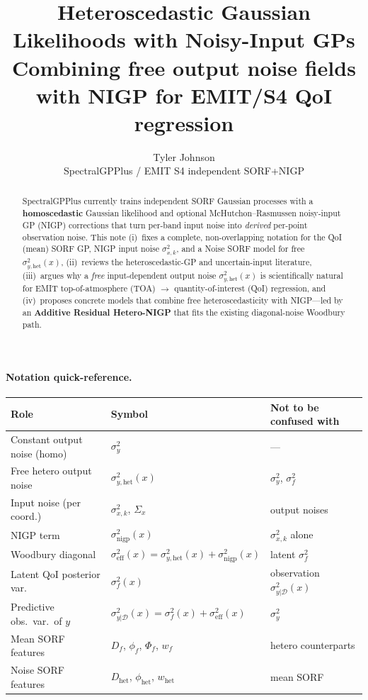 \documentclass[11pt]{article}
\title{Heteroscedastic Gaussian Likelihoods with Noisy-Input GPs\\[0.35em]
\large Combining free output noise fields with NIGP for EMIT/S4 QoI regression}
\author{Tyler Johnson\\
\small SpectralGPPlus / EMIT S4 independent SORF+NIGP}
\date{}
\newcommand{\sigy}{\sigma_{y}^{2}}%
\newcommand{\sighet}{\sigma_{y,\mathrm{het}}^{2}}%
\newcommand{\signigp}{\sigma_{\mathrm{nigp}}^{2}}%
\newcommand{\sigeff}{\sigma_{\mathrm{eff}}^{2}}%
\newcommand{\sigobs}{\sigma_{y|\mathcal{D}}^{2}}%
\newcommand{\Sigx}{\Sigma_{x}}%
\newcommand{\Phif}{\Phi_{f}}%
\begin{document}
\maketitle

\begin{abstract}
\noindent
SpectralGPPlus currently trains independent SORF Gaussian processes with a
\textbf{homoscedastic} Gaussian likelihood and optional McHutchon--Rasmussen
noisy-input GP (NIGP) corrections that turn per-band input noise into
\emph{derived} per-point observation noise.
This note (i)~fixes a complete, non-overlapping notation for the QoI (mean) SORF GP,
NIGP input noise $\sigma_{x,k}^{2}$, and a Noise SORF model for free
$\sighet(x)$,
(ii)~reviews the heteroscedastic-GP and uncertain-input literature,
(iii)~argues why a \emph{free} input-dependent output noise $\sighet(x)$
is scientifically natural for EMIT top-of-atmosphere (TOA) $\to$ quantity-of-interest
(QoI) regression, and (iv)~proposes concrete models that combine free
heteroscedasticity with NIGP---led by an \textbf{Additive Residual Hetero-NIGP}
that fits the existing diagonal-noise Woodbury path.
\end{abstract}

\paragraph{Notation quick-reference.}
\begin{center}
\small
\begin{tabular}{@{}lll@{}}
\toprule
\textbf{Role} & \textbf{Symbol} & \textbf{Not to be confused with} \\
\midrule
Constant output noise (homo) & $\sigy$ & --- \\
Free hetero output noise & $\sighet(x)$ & $\sigy$, $\sigma_f^{2}$ \\
Input noise (per coord.) & $\sigma_{x,k}^{2}$, $\Sigx$ & output noises \\
NIGP term & $\signigp(x)$ & $\sigma_{x,k}^{2}$ alone \\
Woodbury diagonal & $\sigeff(x)=\sighet(x)+\signigp(x)$ & latent $\sigma_f^{2}$ \\
Latent QoI posterior var.\ & $\sigma_f^{2}(x)$ & observation $\sigobs(x)$ \\
Predictive obs.\ var.\ of $y$ & $\sigobs(x)=\sigma_f^{2}(x)+\sigeff(x)$ & $\sigy$ \\
Mean SORF features & $D_f$, $\phi_f$, $\Phif$, $w_f$ & hetero counterparts \\
Noise SORF features & $D_{\mathrm{het}}$, $\phi_{\mathrm{het}}$, $w_{\mathrm{het}}$ & mean SORF \\
\bottomrule
\end{tabular}
\end{center}
\end{document}
